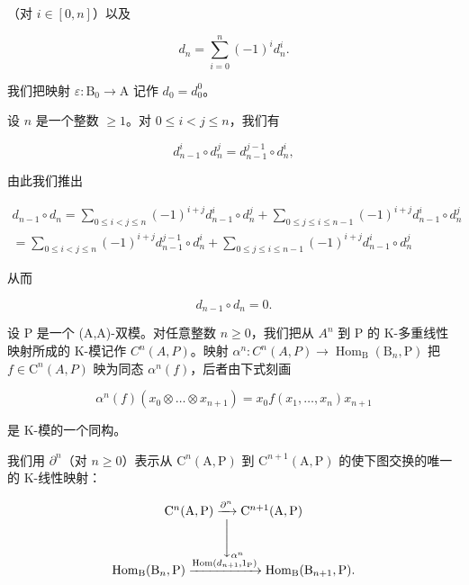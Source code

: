 （对 \(i\in [0,n]\)）以及

\[
d _ {n} = \sum_ {i = 0} ^ {n} (- 1) ^ {i} d _ {n} ^ {i}.\tag{5}
\]

我们把映射 \(\varepsilon : \mathrm{B}_0 \to \mathrm{A}\) 记作 \(d_0 = d_0^0\)。

设 \(n\) 是一个整数 \(\geqslant 1\)。对 \(0 \leqslant i < j \leqslant n\)，我们有

\[
d _ {n - 1} ^ {i} \circ d _ {n} ^ {j} = d _ {n - 1} ^ {j - 1} \circ d _ {n} ^ {i},\tag{6}
\]

由此我们推出

\[
\begin{array}{c} d _ {n - 1} \circ d _ {n} = \sum_ {0 \leqslant i <   j \leqslant n} (- 1) ^ {i + j} d _ {n - 1} ^ {i} \circ d _ {n} ^ {j} + \sum_ {0 \leqslant j \leqslant i \leqslant n - 1} (- 1) ^ {i + j} d _ {n - 1} ^ {i} \circ d _ {n} ^ {j} \\ = \sum_ {0 \leqslant i <   j \leqslant n} (- 1) ^ {i + j} d _ {n - 1} ^ {j - 1} \circ d _ {n} ^ {i} + \sum_ {0 \leqslant j \leqslant i \leqslant n - 1} (- 1) ^ {i + j} d _ {n - 1} ^ {i} \circ d _ {n} ^ {j} \end{array}
\]

从而

\[
d _ {n - 1} \circ d _ {n} = 0.\tag{7}
\]

设 P 是一个 (A,A)-双模。对任意整数 \(n \geqslant 0\)，我们把从 \(A^{n}\) 到 P 的 K-多重线性映射所成的 K-模记作 \(C^{n}(A,P)\)。映射 \(\alpha^{n}: C^{n}(A,P) \to \operatorname{Hom}_{\mathrm{B}}(\mathrm{B}_{n},\mathrm{P})\) 把 \(f \in \mathrm{C}^{n}(A,P)\) 映为同态 \(\alpha^{n}(f)\)，后者由下式刻画

\[
\alpha^ {n} (f) \left(x _ {0} \otimes \dots \otimes x _ {n + 1}\right) = x _ {0} f (x _ {1}, \ldots , x _ {n}) x _ {n + 1}\tag{8}
\]

是 K-模的一个同构。

我们用 \(\partial^{n}\)（对 \(n \geqslant 0\)）表示从 \(\mathrm{C}^{n}(\mathrm{A},\mathrm{P})\) 到 \(\mathrm{C}^{n+1}(\mathrm{A},\mathrm{P})\) 的使下图交换的唯一的 K-线性映射：

\[
\begin{array}{c} \mathrm{C} ^ {n} (\mathrm{A}, \mathrm{P}) \xrightarrow {\partial^ {n}} \mathrm{C} ^ {n + 1} (\mathrm{A}, \mathrm{P}) \\ \Biggl \downarrow_ {\alpha^ {n}} \\ \mathrm{Hom} _ {\mathrm{B}} (\mathrm{B} _ {n}, \mathrm{P}) \xrightarrow {\mathrm{Hom} (d _ {n + 1} , 1 _ {\mathrm{P}})} \mathrm{Hom} _ {\mathrm{B}} (\mathrm{B} _ {n + 1}, \mathrm{P}). \end{array}
\]

